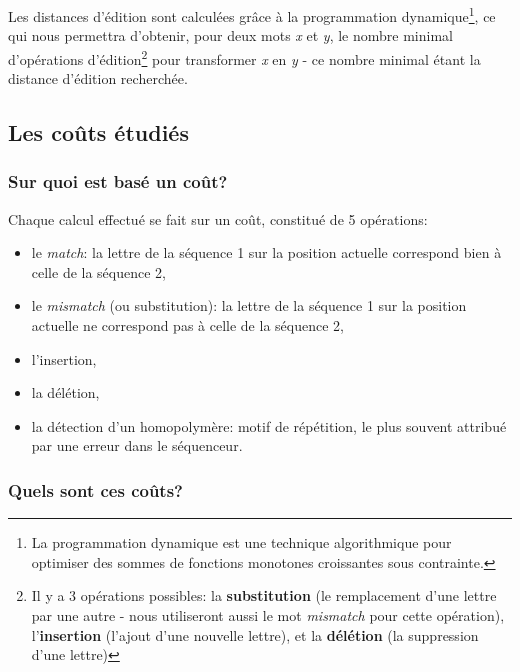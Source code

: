 \documentclass[pdftex,12pt,a4paper]{report}
\begin{document}
\begin{spacing}{1.2}
Les distances d'édition sont calculées grâce à la programmation dynamique\footnote{La programmation dynamique est une technique algorithmique pour optimiser des sommes de fonctions monotones croissantes sous contrainte.}, ce qui nous permettra d'obtenir, pour deux mots \textit{x} et \textit{y}, le nombre minimal d’opérations d’édition\footnote{Il y a 3 opérations possibles: la \textbf{substitution} (le remplacement d'une lettre par une autre - nous utiliseront aussi le mot \textit{mismatch} pour cette opération), l'\textbf{insertion} (l'ajout d'une nouvelle lettre), et la \textbf{délétion} (la suppression d'une lettre)} pour transformer \textit{x} en \textit{y} - ce nombre minimal étant la distance d'édition recherchée.

\subsection{Les coûts étudiés}

\subsubsection{Sur quoi est basé un coût?}

Chaque calcul effectué se fait sur un coût, constitué de 5 opérations:
\begin{itemize}
\item{le \textit{match}: la lettre de la séquence 1 sur la position actuelle correspond bien à celle de la séquence 2,}
\item{le \textit{mismatch} (ou substitution): la lettre de la séquence 1 sur la position actuelle ne correspond pas à celle de la séquence 2,}
\item{l'insertion,}
\item{la délétion,}
\item{la détection d'un homopolymère: motif de répétition, le plus souvent attribué par une erreur dans le séquenceur.}
\end{itemize}

\subsubsection{Quels sont ces coûts?}


\end{spacing}
\end{document}
